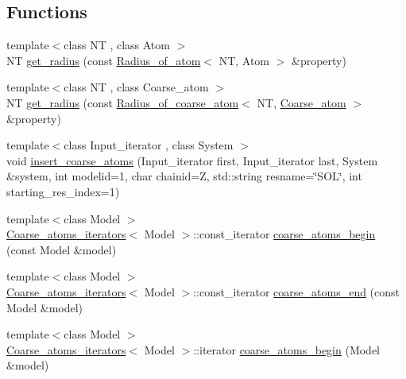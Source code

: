 \subsection*{Functions}
\begin{DoxyCompactItemize}
\item 
{\footnotesize template$<$class NT , class Atom $>$ }\\NT \hyperlink{namespaceESBTL_a339234ee84fc86156f2d2971dd1fd027}{get\+\_\+radius} (const \hyperlink{classESBTL_1_1Radius__of__atom}{Radius\+\_\+of\+\_\+atom}$<$ NT, Atom $>$ \&property)
\item 
{\footnotesize template$<$class NT , class Coarse\+\_\+atom $>$ }\\NT \hyperlink{namespaceESBTL_ab5f456cde3cd8e7210ac2d21366d52c9}{get\+\_\+radius} (const \hyperlink{classESBTL_1_1Radius__of__coarse__atom}{Radius\+\_\+of\+\_\+coarse\+\_\+atom}$<$ NT, \hyperlink{classESBTL_1_1Coarse__atom}{Coarse\+\_\+atom} $>$ \&property)
\item 
{\footnotesize template$<$class Input\+\_\+iterator , class System $>$ }\\void \hyperlink{namespaceESBTL_a87e8430a12d9b6fe0b5f33d9719af7c2}{insert\+\_\+coarse\+\_\+atoms} (Input\+\_\+iterator first, Input\+\_\+iterator last, System \&system, int modelid=1, char chainid=\textquotesingle{}Z\textquotesingle{}, std\+::string resname=\char`\"{}S\+OL\char`\"{}, int starting\+\_\+res\+\_\+index=1)
\item 
{\footnotesize template$<$class Model $>$ }\\\hyperlink{structESBTL_1_1Coarse__atoms__iterators}{Coarse\+\_\+atoms\+\_\+iterators}$<$ Model $>$\+::const\+\_\+iterator \hyperlink{group__grp__iters_gabf07aacb61d906d9cb002b2e585e4eb8}{coarse\+\_\+atoms\+\_\+begin} (const Model \&model)
\item 
{\footnotesize template$<$class Model $>$ }\\\hyperlink{structESBTL_1_1Coarse__atoms__iterators}{Coarse\+\_\+atoms\+\_\+iterators}$<$ Model $>$\+::const\+\_\+iterator \hyperlink{group__grp__iters_gaa526c599e8abd3960e6b16ec2c6ed522}{coarse\+\_\+atoms\+\_\+end} (const Model \&model)
\item 
{\footnotesize template$<$class Model $>$ }\\\hyperlink{structESBTL_1_1Coarse__atoms__iterators}{Coarse\+\_\+atoms\+\_\+iterators}$<$ Model $>$\+::iterator \hyperlink{group__grp__iters_ga44b38b942148d622332c4d9d2b483c84}{coarse\+\_\+atoms\+\_\+begin} (Model \&model)
\item 

\end{DoxyCompactItemize}
